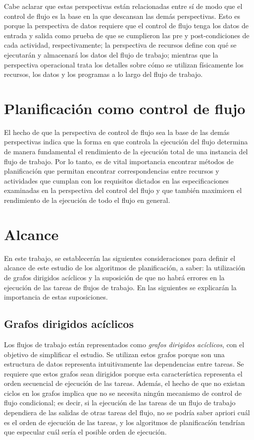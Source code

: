 Cabe aclarar que estas perspectivas están relacionadas entre sí de modo que el control de flujo es la base en la que descansan las demás perspectivas. Esto es porque la perspectiva de datos requiere que el control de flujo tenga los datos de entrada y salida como prueba de que se cumplieron las pre y post-condiciones de cada actividad, respectivamente; la perspectiva de recursos define con qué se ejecutarán y almacenará los datos del flujo de trabajo; mientras que la perspectiva operacional trata los detalles sobre cómo se utilizan físicamente los recursos, los datos y los programas a lo largo del flujo de trabajo.


\section{Planificación como control de flujo}

El hecho de que la perspectiva de control de flujo sea la base de las demás perspectivas indica que la forma en que controla la ejecución del flujo determina de manera fundamental el rendimiento de la ejecución total de una instancia del flujo de trabajo. Por lo tanto, es de vital importancia encontrar métodos de planificación que permitan encontrar correspondencias entre recursos y actividades que cumplan con los requisitos dictados en las especificaciones examinadas en la perspectiva del control del flujo y que también maximicen el rendimiento de la ejecución de todo el flujo en general.

\section{Alcance}

En este trabajo, se establecerán las siguientes consideraciones para definir el alcance de este estudio de los algoritmos de planificación, a saber: la utilización de grafos dirigidos acíclicos y la suposición de que no habrá errores en la ejecución de las tareas de flujos de trabajo. En las siguientes se explicarán la importancia de estas suposiciones.

\subsection{Grafos dirigidos acíclicos}
Los flujos de trabajo están representados como \emph{grafos dirigidos acíclicos}, con el objetivo de simplificar el estudio. Se utilizan estos grafos porque son una estructura de datos representa intuitivamente las dependencias entre tareas. Se requiere que estos grafos sean dirigidos porque esta característica representa el orden secuencial de ejecución de las tareas. Además, el hecho de que no existan ciclos en los grafos implica que no se necesita ningún mecanismo de control de flujo condicional; es decir, si la ejecución de las tareas de un flujo de trabajo dependiera de las salidas de otras tareas del flujo, no se podría saber apriori cuál es el orden de ejecución de las tareas, y los algoritmos de planificacíón tendrían que especular cuál sería el posible orden de ejecución.

